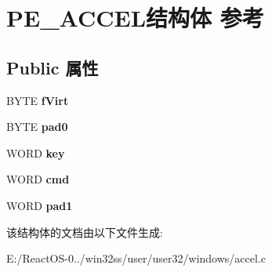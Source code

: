 \hypertarget{struct_p_e___a_c_c_e_l}{}\section{P\+E\+\_\+\+A\+C\+C\+E\+L结构体 参考}
\label{struct_p_e___a_c_c_e_l}
\subsection*{Public 属性}
\begin{DoxyCompactItemize}
\item 
\mbox{\label{struct_p_e___a_c_c_e_l_a4b3b6955602b2ed4abb91f002b1d95b5}} 
B\+Y\+TE {\bfseries f\+Virt}
\item 
\mbox{\label{struct_p_e___a_c_c_e_l_af11cd32fb606e016b394d399da4271ed}} 
B\+Y\+TE {\bfseries pad0}
\item 
\mbox{\label{struct_p_e___a_c_c_e_l_a9c2251689e2a1a4a884747c0f487a1c5}} 
W\+O\+RD {\bfseries key}
\item 
\mbox{\label{struct_p_e___a_c_c_e_l_a0cb77514b6f88d82a8699869fdfdeb57}} 
W\+O\+RD {\bfseries cmd}
\item 
\mbox{\label{struct_p_e___a_c_c_e_l_a4969af2a9a1d14c10793d46126d50f79}} 
W\+O\+RD {\bfseries pad1}
\end{DoxyCompactItemize}


该结构体的文档由以下文件生成\+:\begin{DoxyCompactItemize}
\item 
E\+:/\+React\+O\+S-\/0../win32ss/user/user32/windows/accel.\+c\end{DoxyCompactItemize}
